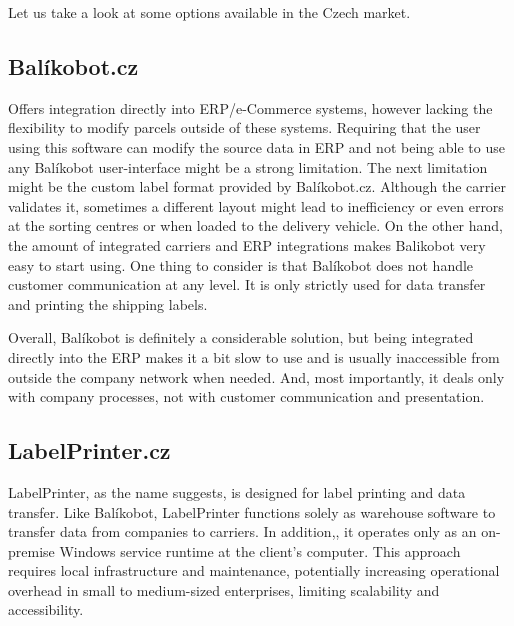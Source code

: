 Let us take a look at some options available in the Czech market.

\subsection{Balíkobot.cz}
\label{subsec:balikobot}
Offers integration directly into \ac{ERP}/e-Commerce systems, however lacking the flexibility to modify parcels outside of these systems.
Requiring that the user using this software can modify the source data in \ac{ERP} and not being able to use any Balíkobot user-interface might be a strong limitation.
The next limitation might be the custom label format provided by Balíkobot.cz.
Although the carrier validates it, sometimes a different layout might lead to inefficiency or even errors at the sorting centres or when loaded to the delivery vehicle.
On the other hand, the amount of integrated carriers and \ac{ERP} integrations makes Balikobot very easy to start using.
One thing to consider is that Balíkobot does not handle customer communication at any level.
It is only strictly used for data transfer and printing the shipping labels.

Overall, Balíkobot is definitely a considerable solution, but being integrated directly into the \ac{ERP} makes it a bit slow to use and is usually inaccessible from outside the company network when needed.
And, most importantly, it deals only with company processes, not with customer communication and presentation.

\subsection{LabelPrinter.cz}
\label{subsec:labelprinter}
LabelPrinter, as the name suggests, is designed for label printing and data transfer. Like Balíkobot, LabelPrinter functions solely as warehouse software to transfer data from companies to carriers.
In addition,, it operates only as an on-premise Windows service runtime at the client's computer.
This approach requires local infrastructure and maintenance, potentially increasing operational overhead in small to medium-sized enterprises, limiting scalability and accessibility.


